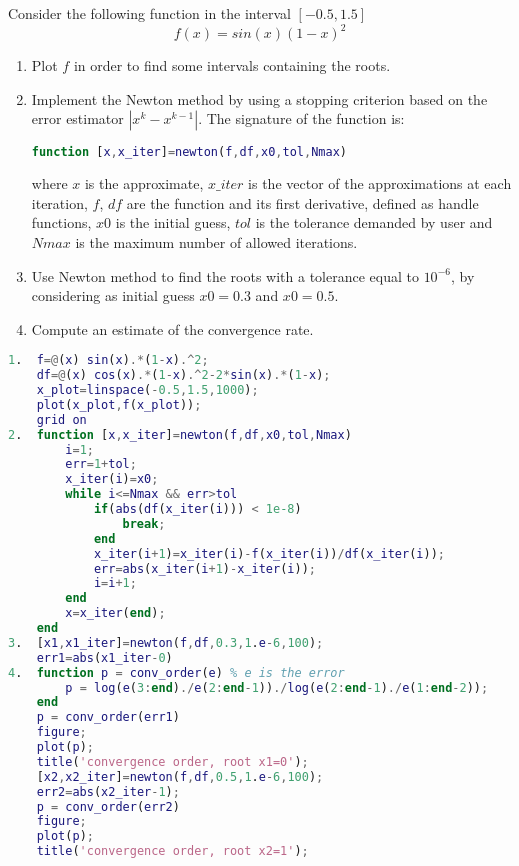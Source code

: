 \documentclass[12pt, a4paper]{report}
\newtheorem[style=M,bodystyle=\normalfont]{theorem}{Theorem}
\newtheorem[style=M,bodystyle=\normalfont]{corollary}{Corollary}
\newtheorem[style=M,bodystyle=\normalfont]{lemma}{Lemma}
\newtheorem[style=M,bodystyle=\normalfont]{definition}{Definition}
\begin{document}
    \newpage

    \begin{Exercise}[label=8]
        Consider the following function in the interval $[-0.5, 1.5]$
        \[f (x) = sin(x)(1 - x)^2\]
        \begin{enumerate}
            \item Plot $f$ in order to find some intervals containing the roots. 
            \item Implement the Newton method by using a stopping criterion based on the error estimator $\left\lvert x^k - x^{k-1}\right\rvert$. The signature of the function is:
                \begin{lstlisting}[language=Matlab]
function [x,x_iter]=newton(f,df,x0,tol,Nmax)
                \end{lstlisting}  
                where $x$ is the approximate, $x\_iter$ is the vector of the approximations at each iteration, $f$, $df$ are the function and its first derivative, defined as
                handle functions, $x0$ is the initial guess, $tol$ is the tolerance demanded by user and $Nmax$ is the maximum number of allowed iterations.
            \item Use Newton method to find the roots with a tolerance equal to $10^{-6}$, by considering as initial guess $x0 = 0.3$ and $x0 = 0.5$.
            \item Compute an estimate of the convergence rate. 
        \end{enumerate}
    \end{Exercise}
    \begin{Answer}[ref=8]
        \begin{lstlisting}[language=Matlab]
1.  f=@(x) sin(x).*(1-x).^2;
    df=@(x) cos(x).*(1-x).^2-2*sin(x).*(1-x);
    x_plot=linspace(-0.5,1.5,1000);
    plot(x_plot,f(x_plot));
    grid on
2.  function [x,x_iter]=newton(f,df,x0,tol,Nmax)
        i=1;
        err=1+tol;
        x_iter(i)=x0;
        while i<=Nmax && err>tol
            if(abs(df(x_iter(i))) < 1e-8) 
                break;
            end
            x_iter(i+1)=x_iter(i)-f(x_iter(i))/df(x_iter(i));
            err=abs(x_iter(i+1)-x_iter(i));
            i=i+1;
        end
        x=x_iter(end);
    end
3.  [x1,x1_iter]=newton(f,df,0.3,1.e-6,100);
    err1=abs(x1_iter-0)
4.  function p = conv_order(e) % e is the error
        p = log(e(3:end)./e(2:end-1))./log(e(2:end-1)./e(1:end-2));
    end
    p = conv_order(err1)
    figure;
    plot(p);
    title('convergence order, root x1=0');
    [x2,x2_iter]=newton(f,df,0.5,1.e-6,100);
    err2=abs(x2_iter-1);
    p = conv_order(err2)
    figure;
    plot(p);
    title('convergence order, root x2=1');
        \end{lstlisting}  
    \end{Answer}
\end{document}
